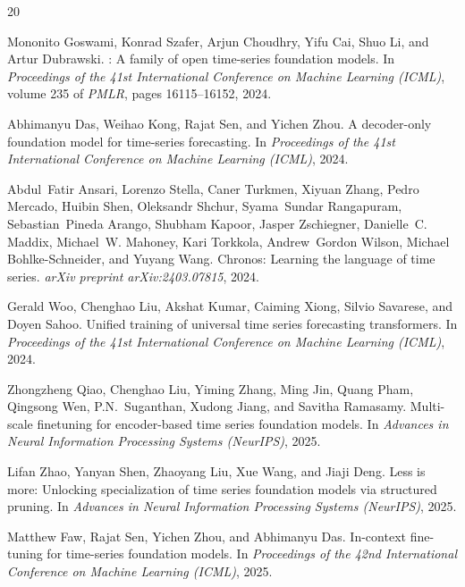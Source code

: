 \documentclass{article}
\begin{document}

\begin{thebibliography}{20}

Mononito Goswami, Konrad Szafer, Arjun Choudhry, Yifu Cai, Shuo Li, and Artur Dubrawski.
: A family of open time-series foundation models.
\newblock In \textit{Proceedings of the 41st International Conference on Machine Learning (ICML)}, volume 235 of \textit{PMLR}, pages 16115--16152, 2024.

Abhimanyu Das, Weihao Kong, Rajat Sen, and Yichen Zhou.
\newblock A decoder-only foundation model for time-series forecasting.
\newblock In \textit{Proceedings of the 41st International Conference on Machine Learning (ICML)}, 2024.

Abdul~Fatir Ansari, Lorenzo Stella, Caner Turkmen, Xiyuan Zhang, Pedro Mercado, Huibin Shen, Oleksandr Shchur, Syama~Sundar Rangapuram, Sebastian~Pineda Arango, Shubham Kapoor, Jasper Zschiegner, Danielle~C. Maddix, Michael~W. Mahoney, Kari Torkkola, Andrew~Gordon Wilson, Michael Bohlke-Schneider, and Yuyang Wang.
\newblock Chronos: Learning the language of time series.
\newblock \textit{arXiv preprint arXiv:2403.07815}, 2024.

Gerald Woo, Chenghao Liu, Akshat Kumar, Caiming Xiong, Silvio Savarese, and Doyen Sahoo.
\newblock Unified training of universal time series forecasting transformers.
\newblock In \textit{Proceedings of the 41st International Conference on Machine Learning (ICML)}, 2024.

Zhongzheng Qiao, Chenghao Liu, Yiming Zhang, Ming Jin, Quang Pham, Qingsong Wen, P.N.~Suganthan, Xudong Jiang, and Savitha Ramasamy.
\newblock Multi-scale finetuning for encoder-based time series foundation models.
\newblock In \textit{Advances in Neural Information Processing Systems (NeurIPS)}, 2025.

Lifan Zhao, Yanyan Shen, Zhaoyang Liu, Xue Wang, and Jiaji Deng.
\newblock Less is more: Unlocking specialization of time series foundation models via structured pruning.
\newblock In \textit{Advances in Neural Information Processing Systems (NeurIPS)}, 2025.

Matthew Faw, Rajat Sen, Yichen Zhou, and Abhimanyu Das.
\newblock In-context fine-tuning for time-series foundation models.
\newblock In \textit{Proceedings of the 42nd International Conference on Machine Learning (ICML)}, 2025.


\end{thebibliography}
\end{document}
